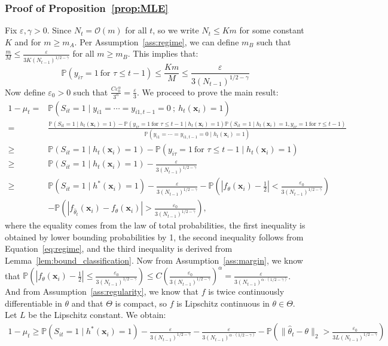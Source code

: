 \documentclass[nonblindrev]{informs3noheader}
\def\P{\mathbb{P}}
\def\calO{\mathcal{O}}
\def\bx{\boldsymbol{x}}
\begin{document}
    \subsubsection*{Proof of Proposition~\ref{prop:MLE}}
    Fix $\varepsilon,\gamma>0$. Since $N_t=\calO(m)$ for all $t$, so we write $N_t\leq Km$ for some constant $K$ and for $m\geq m_A$. Per Assumption~\ref{ass:regime}, we can define $m_B$ such that $\frac{m}{M}\leq\frac{\varepsilon}{3K(N_{t-1})^{1/2-\gamma}}$ for all $m \geq m_B$. This implies that:
    \begin{equation}
        \P(y_{i\tau}=1\ \text{for $\tau\leq t-1$})\leq \frac{Km}{M} \leq \frac{\varepsilon}{3(N_{t-1})^{1/2-\gamma}} \label{eq:regime}
    \end{equation}
    Now define $\varepsilon_0>0$ such that $\frac{C\varepsilon_0^\alpha}{3^\alpha}=\frac{\varepsilon}{3}$. We proceed to prove the main result:
\begin{align*}
1-\mu_t=&\P(S_{it}=1 \mid y_{i1}=\cdots=y_{i1,t-1}=0\ ;\ h_t(\bx_i)=1)\\
=&\frac{\P(S_{it}=1 \mid h_t(\bx_i)=1)-\P(y_{i\tau}=1\ \text{for $\tau\leq t-1$} \mid h_t(\bx_i)=1)\P(S_{it}=1 \mid h_t(\bx_i)=1, y_{i\tau}=1\ \text{for $\tau\leq t-1$})}{\P(y_{i1}=\cdots=y_{i1,t-1}=0 \mid h_t(\bx_i)=1)}\\
\geq& \P(S_{it}=1 \mid h_t(\bx_i)=1)-\P(y_{i\tau}=1\ \text{for $\tau\leq t-1$} \mid h_t(\bx_i)=1)\\
\geq&\P(S_{it}=1 \mid h_t(\bx_i)=1)-\frac{\varepsilon}{3(N_{t-1})^{1/2-\gamma}}\\
\geq&\P(S_{it}=1 \mid h^*(\bx_i)=1)-\frac{\varepsilon}{3(N_{t-1})^{1/2-\gamma}}- \P\left( \left|f_{\theta}(\bx_i) - \frac{1}{2}\right| < \frac{\varepsilon_0}{3(N_{t-1})^{1/2-\gamma}} \right)\\
    &-\P\left( \left|f_{\widehat\theta_t}(\bx_i) - f_{\theta}(\bx_i)\right| > \frac{\varepsilon_0}{3(N_{t-1})^{1/2-\gamma}} \right),
\end{align*}
where the equality comes from the law of total probabilities, the first inequality is obtained by lower bounding probabilities by 1, the second inequality follows from Equation~\eqref{eq:regime}, and the third inequality is derived from Lemma~\ref{lem:bound_classification}.
Now from Assumption~\ref{ass:margin}, we know that $\P\left( \left|f_{\theta}(\bx_i) - \frac{1}{2}\right| \leq \frac{\varepsilon_0}{3(N_{t-1})^{1/2-\gamma}} \right)\leq C\left(\frac{\varepsilon_0}{3(N_{t-1})^{1/2-\gamma}}\right)^\alpha=\frac{\varepsilon}{3(N_{t-1})^{\alpha\cdot(1/2-\gamma)}}$. And from Assumption~\ref{ass:regularity}, we know that $f$ is twice continuously differentiable in $\theta$ and that $\Theta$ is compact, so $f$ is Lipschitz continuous in $\theta\in\Theta$. Let $L$ be the Lipschitz constant. We obtain:
\begin{align*}
1-\mu_t\geq\P(S_{it}=1 \mid h^*(\bx_i)=1)-\frac{\varepsilon}{3(N_{t-1})^{1/2-\gamma}}- \frac{\varepsilon}{3(N_{t-1})^{\alpha\cdot(1/2-\gamma)}}
    -\P\left( \|\widehat\theta_t-\theta\|_2 > \frac{\varepsilon_0}{3L(N_{t-1})^{1/2-\gamma}} \right)
\end{align*}
\end{document}
